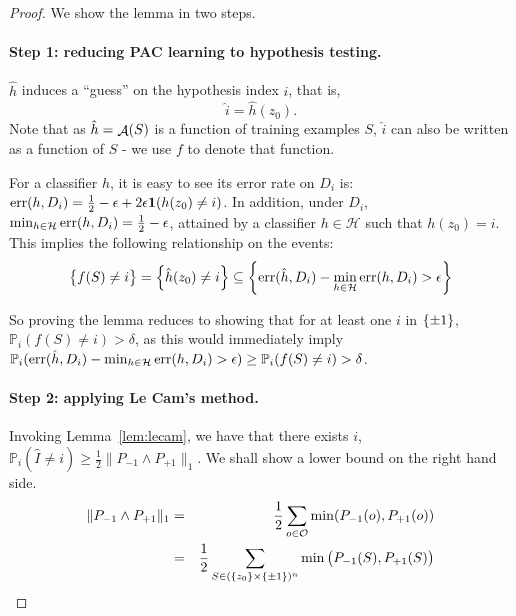 \documentclass{article}
\DeclareMathOperator*{\err}{{\rm err}}
\DeclareMathOperator*{\Acal}{{\cal A}}
\newcommand{\PP}{\mathbb{P}}
\newcommand{\Hcal}{\mathcal{H}}
\newcommand{\Ocal}{\mathcal{O}}
\newcommand*{\one}{{\bf 1}}
\begin{document}
\begin{proof}
We show the lemma in two steps.

\paragraph{Step 1: reducing PAC learning to hypothesis testing.}
$\hat{h}$ induces a ``guess'' on the hypothesis index $i$, that is,
\[ \hat{i} = \hat{h}(z_0). \]
Note that as $\hat{h} = \Acal(S)$ is a function of training examples $S$, $\hat{i}$
can also be written as a function of $S$ - we use $f$ to denote that function.

For a classifier $h$, it is easy to see its error rate on $D_i$ is:
$\err(h, D_i) = \frac12 - \epsilon + 2\epsilon \one(h(z_0) \neq i)$. In addition,
under $D_i$, $\min_{h \in \Hcal} \err(h, D_i) = \frac12 - \epsilon$, attained by a classifier
$h \in \Hcal$ such that $h(z_0) = i$. This implies the following relationship on the events:
\[ \cbr{f(S) \neq i} = \cbr{\hat{h}(z_0) \neq i} \subseteq \cbr{\err(\hat{h}, D_i) - \min_{h \in \Hcal} \err(h, D_i) > \epsilon} \]


So proving the lemma reduces to showing that for at least one $i$ in $\cbr{\pm 1}$, $\PP_i(f(S) \neq i) > \delta$, as this would immediately imply $\PP_i(\err(\hat{h}, D_i) - \min_{h \in \Hcal} \err(h, D_i) > \epsilon) \geq \PP_i(f(S) \neq i) > \delta$.


\paragraph{Step 2: applying Le Cam's method.}
Invoking Lemma~\ref{lem:lecam}, we have that there exists $i$, $\PP_i(\hat{I} \neq i) \geq \frac12 \|P_{-1} \wedge P_{+1}\|_1$. We shall show a lower bound on the right hand side.
\begin{eqnarray}
 \|P_{-1} \wedge P_{+1}\|_1
  &=& \frac12\sum_{o \in \Ocal} \min(P_{-1}(o), P_{+1}(o)) \nonumber \\
  &=& \frac12\sum_{S \in (\cbr{z_0} \times \cbr{\pm 1})^n} \min\del{P_{-1}(S), P_{+1}(S)}
  \label{eqn:explicit-tv}
\end{eqnarray}

\end{proof}
\end{document}
